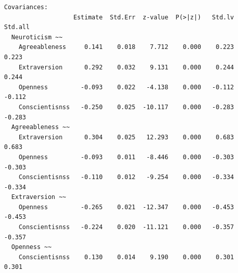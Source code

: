 \documentclass[
  a4paper,
]{ltjsbook}
\begin{document}
\begin{verbatim}
Covariances:
                   Estimate  Std.Err  z-value  P(>|z|)   Std.lv  Std.all
  Neuroticism ~~                                                        
    Agreeableness     0.141    0.018    7.712    0.000    0.223    0.223
    Extraversion      0.292    0.032    9.131    0.000    0.244    0.244
    Openness         -0.093    0.022   -4.138    0.000   -0.112   -0.112
    Conscientisnss   -0.250    0.025  -10.117    0.000   -0.283   -0.283
  Agreeableness ~~                                                      
    Extraversion      0.304    0.025   12.293    0.000    0.683    0.683
    Openness         -0.093    0.011   -8.446    0.000   -0.303   -0.303
    Conscientisnss   -0.110    0.012   -9.254    0.000   -0.334   -0.334
  Extraversion ~~                                                       
    Openness         -0.265    0.021  -12.347    0.000   -0.453   -0.453
    Conscientisnss   -0.224    0.020  -11.121    0.000   -0.357   -0.357
  Openness ~~                                                           
    Conscientisnss    0.130    0.014    9.190    0.000    0.301    0.301


\end{verbatim}
\end{document}
